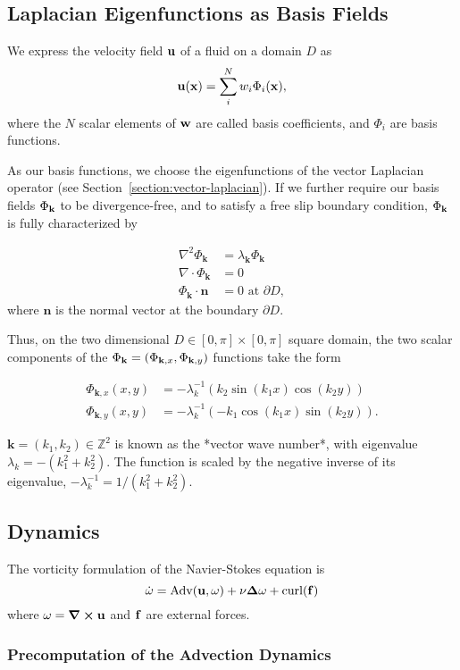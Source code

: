 \subsection*{Laplacian Eigenfunctions as Basis Fields}
We express the velocity field $\vb{u}$ of a fluid on a domain $D$ as
$$\vb{u}(\vb{x})=\sum_i^N w_i \Phi_i(\vb{x}),$$
where the $N$ scalar elements of $\vb{w}$ are called basis coefficients, and
${\Phi_i}$ are basis functions.

As our basis functions, we choose the eigenfunctions of the vector Laplacian
operator (see Section~\ref{section:vector-laplacian}). If we further require our
basis fields $\Phi_{\vb{k}}$ to be divergence-free, and to satisfy a free slip
boundary condition, $\Phi_{\vb{k}}$ is fully characterized by

\begin{align*}
\nabla^2 \Phi_{\textbf{k}} &= \lambda_{\textbf{k}}\Phi_{\textbf{k}} \\
\nabla \cdot \Phi_{\textbf{k}} &= 0 \\
\Phi_{\textbf{k}} \cdot \textbf{n} &= 0 \text{ at } \partial D,
\end{align*}
where $\textbf{n}$ is the normal vector at the boundary $\partial D$.

Thus, on the two dimensional $D \in [0, \pi] \times [0, \pi]$ square domain, the
two scalar components of the $\Phi_{\vb{k}} =(\Phi_{\vb{k}, x},
\Phi_{\vb{k},y})$ functions take the form 

\begin{align*}
\Phi_{\textbf{k},x}(x, y) &= -\lambda_k^{-1} 
    ( k_2 \sin(k_1 x) \cos(k_2 y) ) \\
\Phi_{\textbf{k},y}(x, y) &= -\lambda_k^{-1}
    ( -k_1 \cos(k_1 x) \sin(k_2 y) ).
\end{align*}

$\textbf{k} = (k_1, k_2) \in \mathbb{Z}^2$ is known as the *vector wave
number*, with eigenvalue $\lambda_k = -(k_1^2 + k_2^2)$. 
The function is scaled by the negative inverse of its eigenvalue, 
$-\lambda_k^{-1} = 1/(k_1^2 + k_2^2)$.

\subsection*{Dynamics}
The vorticity formulation of the Navier-Stokes equation is
\begin{equation}\label{eq:NSE-vorticity}
    \dot{\bf{\omega}} = \text{Adv}(\bf{u}, \bf{\omega}) + \nu \Delta\bf{\omega}
    + \text{curl}(\bf{f})
\end{equation}
where $\bf{\omega} = \curl{\bf{u}}$ and $\bf{f}$ are external forces.

\subsubsection*{Precomputation of the Advection Dynamics}
\todo{}





















